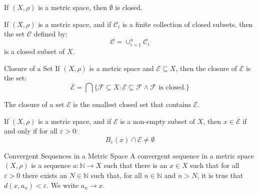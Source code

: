 \documentclass[crop=false,class=article,oneside]{standalone}
\begin{document}
            \begin{theorem}
                If $(X,\rho)$ is a metric space, then $\emptyset$ is closed.
            \end{theorem}
            \begin{theorem}
                If $(X,\rho)$ is a metric space, and if $\mathcal{C}_{i}$ is
                a finite collection of closed subsets, then the set
                $\mathcal{C}$ defined by:
                \begin{equation}
                    \mathcal{C}=\cup_{i=1}^{n}\mathcal{C}_{i}
                \end{equation}
                is a closed subset of $X$.
            \end{theorem}
            \begin{ldefinition}{Closure of a Set}
                If $(X,\rho)$ is a metric space and $\mathcal{E}\subseteq{X}$,
                then the closure of $\mathcal{E}$ is the set:
                \begin{equation}
                    \overline{\mathcal{E}}=
                    \bigcap\{\mathcal{F}\subseteq{X}:
                        \mathcal{E}\subseteq\mathcal{F}\land\mathcal{F}
                        \textrm{ is closed.}\}
                \end{equation}
            \end{ldefinition}
            The closure of a set $\mathcal{E}$ is the smallest closed set that
            contains $\mathcal{E}$.
            \begin{theorem}
                If $(X,\rho)$ is a metric space, and if
                $\mathcal{E}$ is a non-empty subset of $X$, then
                $x\in\overline{\mathcal{E}}$ if and only if for
                all $\varepsilon>0$:
                \begin{equation}
                    B_{\varepsilon}(x)\cap\mathcal{E}\ne\emptyset
                \end{equation}
            \end{theorem}
            \begin{ldefinition}{Convergent Sequences in a Metric Space}
                A convergent sequence in a metric space $(X,\rho)$ is a
                sequence $a:\mathbb{N}\rightarrow{X}$ such that there is an
                $x\in{X}$ such that for all $\varepsilon>0$ there exists an
                $N\in\mathbb{N}$ such that, for all $n\in\mathbb{N}$ and
                $n>N$, it is true that $d(x,a_{n})<\varepsilon$. We write
                $a_{n}\rightarrow{x}$.
            \end{ldefinition}
\end{document}
